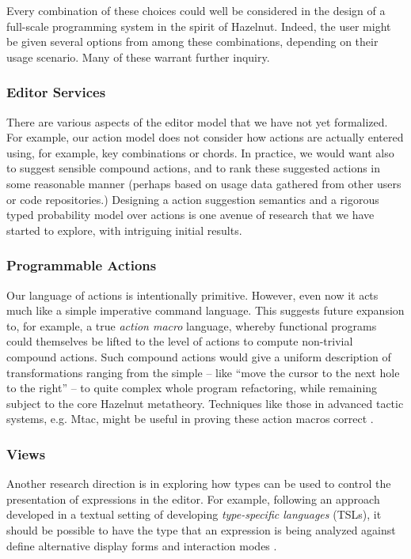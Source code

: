 \documentclass[9pt]{sigplanconf}
\begin{document}
Every combination of these choices could well be considered in the design
of a full-scale programming system in the spirit of Hazelnut. Indeed, the
user might be given several options from among these combinations,
depending on their usage scenario. Many of these warrant further inquiry.


\subsubsection{Editor Services}
There are various aspects of the editor model that we have not yet
formalized. For example, our action model does not consider how actions are
actually entered using, for example, key combinations or chords. In
practice, we would want also to suggest sensible compound actions, and 
to rank these suggested actions in some reasonable
manner (perhaps based on usage data gathered from other users or code
repositories.) Designing a action suggestion semantics and a rigorous typed probability model over actions is one avenue of research that we have started to
explore, with intriguing initial results.

\subsubsection{Programmable Actions}
Our language of actions is intentionally primitive. However, even now it
acts much like a simple imperative command language. This suggests future
expansion to, for example, a true \emph{action macro} language, whereby
functional programs could themselves be lifted to the level of actions to
compute non-trivial compound actions. Such compound actions would give a
uniform description of transformations ranging from the simple -- like
``move the cursor to the next hole to the right'' -- to quite complex whole
program refactoring, while remaining subject to the core Hazelnut
metatheory. Techniques like those in advanced tactic systems, e.g. Mtac, might be useful 
in proving these action macros correct \cite{Ziliani:2013:MMT:2544174.2500579}.

\subsubsection{Views}
Another research direction is in exploring how types can be used to control
the presentation of expressions in the editor. For example, following an
approach developed in a textual setting of developing \emph{type-specific
languages} (TSLs), it should be possible to have the type that an
expression is being analyzed against define alternative display forms and
interaction modes \cite{TSLs}.
\end{document}
